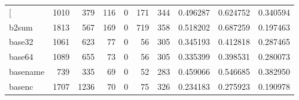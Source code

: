 \begin{longtable}{lrrrrrrrrr}
\bottomrule
\endlastfoot
{[}         &                                               1010 &                                                379 &                                                116 &                                                  0 &                                                171 &                                                344 &                                           0.496287 &                               0.624752 &                             0.340594 \\
b2sum     &                                               1813 &                                                567 &                                                169 &                                                  0 &                                                719 &                                                358 &                                           0.518202 &                               0.687259 &                             0.197463 \\
base32    &                                               1061 &                                                623 &                                                 77 &                                                  0 &                                                 56 &                                                305 &                                           0.345193 &                               0.412818 &                             0.287465 \\
base64    &                                               1089 &                                                655 &                                                 73 &                                                  0 &                                                 56 &                                                305 &                                           0.335399 &                               0.398531 &                             0.280073 \\
basename  &                                                739 &                                                335 &                                                 69 &                                                  0 &                                                 52 &                                                283 &                                           0.459066 &                               0.546685 &                             0.382950 \\
basenc    &                                               1707 &                                               1236 &                                                 70 &                                                  0 &                                                 75 &                                                326 &                                           0.234183 &                               0.275923 &                             0.190978 \\

\end{longtable}
